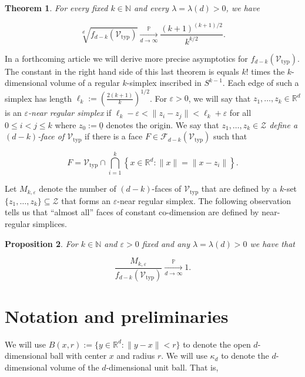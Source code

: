 \documentclass[11pt]{article}%
\newtheorem{theorem}{Theorem} %
\newtheorem{proposition} [theorem] {Proposition}%
\newcommand{\Fcal}[0]{\ensuremath{{\mathcal F}}}
\newcommand{\Vcal}[0]{\ensuremath{{\mathcal V}}}
\newcommand{\Zcal}[0]{\ensuremath{{\mathcal Z}}}
\newcommand{\eR}[0]{\ensuremath{ \mathbb R}}
\newcommand{\eN}[0]{\ensuremath{ \mathbb N}}
\newcommand{\norm}[1]{\ensuremath{\|#1\|}}
\newcommand{\Pee}[0]{\ensuremath{{\mathbb P}}}
\newcommand{\eps}{\varepsilon}
\newcommand{\Vtyp}[0]{\Vcal_{\text{typ}}}
\begin{document}
\begin{theorem}\label{thm:fass}
For every fixed $k \in \eN$ and every $\lambda=\lambda(d)>0$, we have 

$$ \sqrt[d]{f_{d-k}\left(\Vtyp\right)} \xrightarrow[d\to\infty]{\Pee} 
\frac{(k+1)^{(k+1)/2}}{k^{k/2}}.
$$

\end{theorem}

In a forthcoming article we will derive more precise asymptotics for $f_{d-k}\left(\Vtyp\right)$.
The constant in the right hand side of this last theorem is equals $k!$ times the $k$-dimensional volume of 
a regular $k$-simplex inscribed in $S^{k-1}$.
Each edge of such a simplex has length $\ell_k := \left(\frac{2(k+1)}{k}\right)^{1/2}$.
For $\eps>0$, we will say that $z_1,\dots,z_k \in \eR^d$ is an {\em $\eps$-near regular simplex} if 
$\ell_k - \eps < \norm{z_i-z_j} < \ell_k+\eps$ for all $0\leq i < j \leq k$ where $z_0 := \underline{0}$
denotes the origin.
We say that $z_1, \dots, z_k \in \Zcal$ {\em define a $(d-k)$-face of $\Vtyp$} if 
there is a face $F \in \Fcal_{d-k}(\Vtyp)$ such that 

$$ F = \Vtyp \cap \bigcap_{i=1}^k \left\{ x \in \eR^d : \norm{x} = \norm{x-z_i} \right\}. $$

Let $M_{k,\eps}$ denote the number of $(d-k)$-faces of $\Vtyp$ that 
are defined by a $k$-set $\{z_1,\dots,z_k\} \subseteq \Zcal$ 
that forms an $\eps$-near regular simplex.
The following observation tells us that ``almost all'' faces of constant co-dimension 
are defined by near-regular simplices.

\begin{proposition}\label{prop:Nkeps}
For $k \in \eN$ and $\eps>0$ fixed and any $\lambda=\lambda(d)>0$ we have that 

$$ \frac{M_{k,\eps}}{f_{d-k}(\Vtyp)} \xrightarrow[d\to\infty]{\Pee} 1. $$

\end{proposition}




\section{Notation and preliminaries\label{sec:prelim}}



We will use $B(x,r) := \{ y \in\eR^d : \norm{y-x} < r\}$ to denote the open $d$-dimensional ball with center $x$ and
radius $r$.
We will use $\kappa_d$ to denote the $d$-dimensional volume of the $d$-dimensional unit ball. That is,
\end{document}
